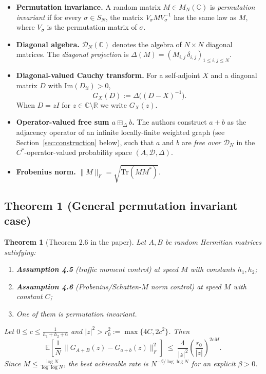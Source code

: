 \documentclass[11pt,a4paper]{article}
\newtheorem{theorem}{Theorem}
\begin{document}
\begin{itemize}[leftmargin=*]
\item \textbf{Permutation invariance.} A random matrix $M\in M_N(\mathbb{C})$ is \emph{permutation invariant} if for every $\sigma\in S_N$, the matrix $V_\sigma M V_\sigma^{-1}$ has the same law as $M$, where $V_\sigma$ is the permutation matrix of $\sigma$.

\item \textbf{Diagonal algebra.} $\mathcal{D}_N(\mathbb{C})$ denotes the algebra of $N\times N$ diagonal matrices. The \emph{diagonal projection} is $\Delta(M) = (M_{i,j}\,\delta_{i,j})_{1\le i,j\le N}$.

\item \textbf{Diagonal-valued Cauchy transform.} For a self-adjoint $X$ and a diagonal matrix $D$ with $\mathrm{Im}(D_{ii})>0$,
\[
  G_X(D) := \Delta\!\bigl((D - X)^{-1}\bigr).
\]
When $D = zI$ for $z\in\mathbb{C}\setminus\mathbb{R}$ we write $G_X(z)$.

\item \textbf{Operator-valued free sum $a\boxplus_\Delta b$.} The authors construct $a+b$ as the adjacency operator of an infinite locally-finite weighted graph (see Section~\ref{sec:construction} below), such that $a$ and $b$ are \emph{free over $\mathcal{D}_N$} in the $C^*$-operator-valued probability space $(A,\mathcal{D},\Delta)$.

\item \textbf{Frobenius norm.} $\|M\|_F = \sqrt{\mathrm{Tr}(MM^*)}$.
\end{itemize}

\subsection*{Theorem 1 (General permutation invariant case)}

\begin{theorem}[Theorem 2.6 in the paper]
Let $A,B$ be random Hermitian matrices satisfying:
\begin{enumerate}
\item \textbf{Assumption 4.5} (traffic moment control) at speed $M$ with constants $h_1, h_2$;
\item \textbf{Assumption 4.6} (Frobenius/Schatten-$M$ norm control) at speed $M$ with constant $C$;
\item One of them is permutation invariant.
\end{enumerate}
Let $0\le c \le \frac{1}{h_1+h_2+6}$ and $|z|^2 > r_0^2 := \max\{4C, 2c^2\}$. Then
\[
  \mathbb{E}\left[\frac{1}{N}\,\bigl\|G_{A+B}(z) - G_{a+b}(z)\bigr\|_F^2\right]
  \;\le\; \frac{4}{|z|^2}\left(\frac{r_0}{|z|}\right)^{2cM}.
\]
Since $M \le \frac{\log N}{\log\log N}$, the best achievable rate is $N^{-\beta/\log\log N}$ for an explicit $\beta>0$.
\end{theorem}
\end{document}

